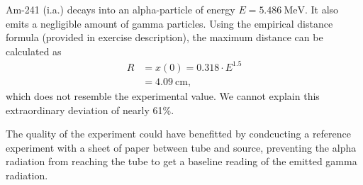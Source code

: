 Am-241 (i.a.) decays into an alpha-particle of energy $E=\SI{5.486}{\mega\electronvolt}$.
It also emits a negligible amount of gamma particles.
Using the empirical distance formula (provided in exercise description), the maximum distance can be calculated as
\begin{align*}
	R &= x(0) = \num{0.318}\cdot E^{\num{1.5}} \\
	&=\SI{4.09}{\centi\meter},
\end{align*}
which does not resemble the experimental value.
We cannot explain this extraordinary deviation of nearly \num{61}\%.

The quality of the experiment could have benefitted by condcucting a reference experiment with a sheet of paper between tube and source, preventing the alpha radiation from reaching the tube to get a baseline reading of the emitted gamma radiation.
